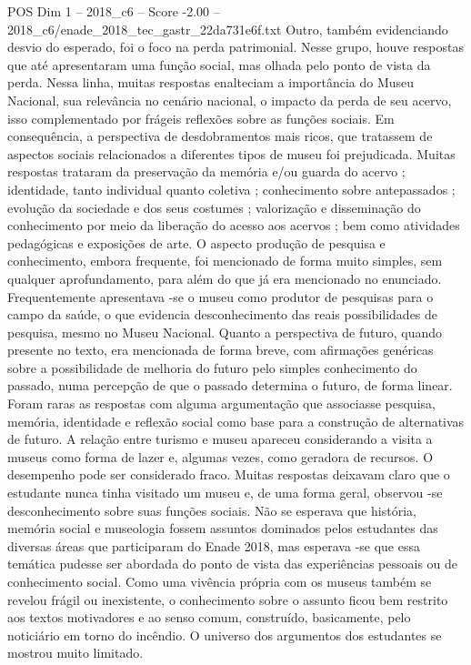 \begin{textsample}{POS Dim 1 – 2018\_c6 – Score -2.00 – 2018\_c6/enade\_2018\_tec\_gastr\_22da731e6f.txt}
Outro, também evidenciando desvio do esperado, foi o foco na perda patrimonial.
Nesse grupo, houve respostas que até apresentaram uma função social, mas olhada pelo ponto de vista da perda.
Nessa linha, muitas respostas enalteciam a importância do Museu Nacional, sua relevância no cenário nacional, o impacto da perda de seu acervo, isso complementado por frágeis reflexões sobre as funções sociais.
Em consequência, a perspectiva de desdobramentos mais ricos, que tratassem de aspectos sociais relacionados a diferentes tipos de museu foi prejudicada.
Muitas respostas trataram da preservação da memória e/ou guarda do acervo ; identidade, tanto individual quanto coletiva ; conhecimento sobre antepassados ; evolução da sociedade e dos seus costumes ; valorização e disseminação do conhecimento por meio da liberação do acesso aos acervos ; bem como atividades pedagógicas e exposições de arte.
O aspecto produção de pesquisa e conhecimento, embora frequente, foi mencionado de forma muito simples, sem qualquer aprofundamento, para além do que já era mencionado no enunciado.
Frequentemente apresentava -se o museu como produtor de pesquisas para o campo da saúde, o que evidencia desconhecimento das reais possibilidades de pesquisa, mesmo no Museu Nacional.
Quanto a perspectiva de futuro, quando presente no texto, era mencionada de forma breve, com afirmações genéricas sobre a possibilidade de melhoria do futuro pelo simples conhecimento do passado, numa percepção de que o passado determina o futuro, de forma linear.
Foram raras as respostas com alguma argumentação que associasse pesquisa, memória, identidade e reflexão social como base para a construção de alternativas de futuro.
A relação entre turismo e museu apareceu considerando a visita a museus como forma de lazer e, algumas vezes, como geradora de recursos.
O desempenho pode ser considerado fraco.
Muitas respostas deixavam claro que o estudante nunca tinha visitado um museu e, de uma forma geral, observou -se desconhecimento sobre suas funções sociais.
Não se esperava que história, memória social e museologia fossem assuntos dominados pelos estudantes das diversas áreas que participaram do Enade 2018, mas esperava -se que essa temática pudesse ser abordada do ponto de vista das experiências pessoais ou de conhecimento social.
Como uma vivência própria com os museus também se revelou frágil ou inexistente, o conhecimento sobre o assunto ficou bem restrito aos textos motivadores e ao senso comum, construído, basicamente, pelo noticiário em torno do incêndio.
O universo dos argumentos dos estudantes se mostrou muito limitado.

\end{textsample}
